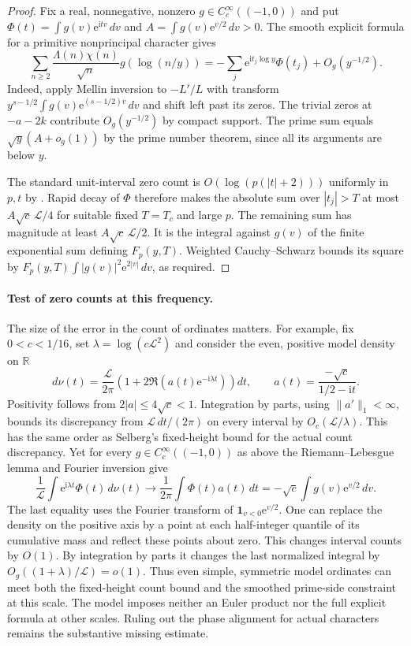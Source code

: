 \documentclass[11pt]{article}
\newcommand{\LL}{\mathcal L}
\newcommand{\e}{\mathrm e}
\newcommand{\ii}{\mathrm i}
\newcommand{\R}{\mathbb R}
\begin{document}
\begin{proof}
Fix a real, nonnegative, nonzero $g\in C_c^\infty((-1,0))$ and put
$\Phi(t)=\int g(v)\e^{\ii tv}\,dv$ and $A=\int g(v)\e^{v/2}\,dv>0$.
The smooth explicit formula for a primitive nonprincipal character gives
\[
 \sum_{n\ge2}\frac{\Lambda(n)\chi(n)}{\sqrt n}g(\log(n/y))
 =-\sum_j\e^{\ii t_j\log y}\Phi(t_j)+O_g(y^{-1/2}).
\]
Indeed, apply Mellin inversion to $-L'/L$ with transform
$y^{s-1/2}\int g(v)\e^{(s-1/2)v}\,dv$ and shift left past its zeros.
The trivial zeros at $-a-2k$ contribute $O_g(y^{-1/2})$ by compact
support. The prime sum equals $\sqrt y(A+o_g(1))$ by the prime number
theorem, since all its arguments are below $y$.

The standard unit-interval zero count is $O(\log(p(|t|+2)))$
uniformly in $p,t$ by \cite[Section 3]{fourier}. Rapid decay of $\Phi$
therefore makes the absolute sum over $|t_j|>T$ at most
$A\sqrt c\,\LL/4$ for suitable fixed $T=T_c$ and large $p$.
The remaining sum has magnitude at least $A\sqrt c\,\LL/2$.
It is the integral against $g(v)$ of the finite exponential sum defining
$F_p(y,T)$. Weighted Cauchy--Schwarz bounds its square by
$F_p(y,T)\int |g(v)|^2\e^{2|v|}\,dv$, as required.
\end{proof}

\paragraph{Test of zero counts at this frequency.}
The size of the error in the count of ordinates matters. For example,
fix $0<c<1/16$, set $\lambda=\log(c\LL^2)$ and consider the even,
positive model density on $\R$
\[
 d\nu(t)=\frac{\LL}{2\pi}\left(1+2\Re(a(t)\e^{-\ii\lambda t})\right)dt,
 \qquad a(t)=\frac{-\sqrt c}{1/2-\ii t}.
\]
Positivity follows from $2|a|\le4\sqrt c<1$. Integration by parts,
using $\|a'\|_1<\infty$, bounds its discrepancy from
$\LL\,dt/(2\pi)$ on every interval by $O_c(\LL/\lambda)$. This has the
same order as Selberg's fixed-height bound for the actual count discrepancy.
Yet for every $g\in C_c^\infty((-1,0))$ as above the
Riemann--Lebesgue lemma and Fourier inversion give
\[
 \frac1{\LL}\int \e^{\ii\lambda t}\Phi(t)\,d\nu(t)
 \longrightarrow \frac1{2\pi}\int \Phi(t)a(t)\,dt
 =-\sqrt c\int g(v)\e^{v/2}\,dv .
\]
The last equality uses the Fourier transform of
$\mathbf 1_{v<0}\e^{v/2}$. One can replace the density on the positive
axis by a point at each half-integer quantile of its cumulative mass and
reflect these points about zero. This changes interval counts by $O(1)$.
By integration by parts it changes the last normalized integral by
$O_g((1+\lambda)/\LL)=o(1)$. Thus even simple, symmetric model ordinates
can meet both the fixed-height count bound and the smoothed prime-side
constraint at this scale. The model imposes neither an Euler product
nor the full explicit formula at other scales. Ruling out the phase
alignment for actual characters remains the substantive missing estimate.
\end{document}
